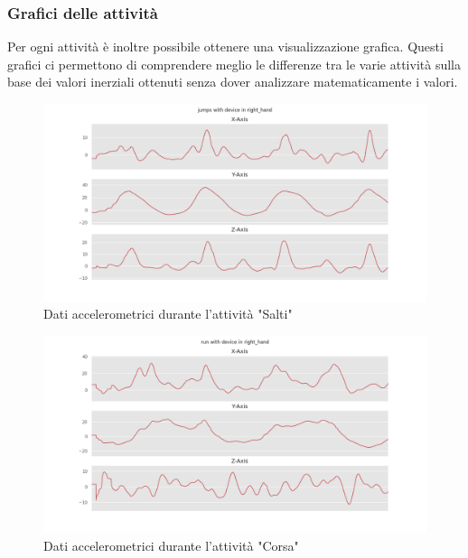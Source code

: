 \subsubsection{Grafici delle attività}
Per ogni attività è inoltre possibile ottenere una visualizzazione grafica. Questi grafici ci permettono di comprendere meglio le differenze 
tra le varie attività sulla base dei valori inerziali ottenuti senza dover analizzare matematicamente i valori.

\begin{figure}[H]
    \centering
    \includegraphics[scale = 0.45]{assets/images/classifications/accelerometer/right_hand/jumps-right-hand-acc.png}
    \caption{Dati accelerometrici durante l'attività "Salti"}
\end{figure}
\begin{figure}[H]
    \centering
    \includegraphics[scale = 0.45]{assets/images/classifications/accelerometer/right_hand/run-right-hand-acc.png}
    \caption{Dati accelerometrici durante l'attività "Corsa"}
\end{figure}
